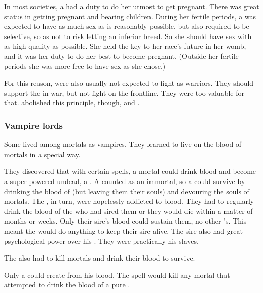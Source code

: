 In most \resphan{} societies, a \resvil{} had a duty to do her utmost to get pregnant. 
There was great status in getting pregnant and bearing children. 
During her fertile periods, a \resvil{} was expected to have as much sex as is reasonably possible, but also required to be selective, so as not to risk letting an inferior \resphan{} breed. 
So she should have sex with as high-quality \resphain{} as possible. 
She held the key to her race's future in her womb, and it was her duty to do her best to become pregnant. 
(Outside her fertile periods she was more free to have sex as she chose.)

For this reason, \resviel{} were also usually not expected to fight as warriors. 
They should support the \resphain{} in war, but not fight on the frontline. 
They were too valuable for that. 
\Mystraacht{} abolished this principle, though, and . 





\subsubsection{Vampire lords}
Some \ashenblood \resphain lived among mortals as vampires. 
They learned to live on the blood of mortals in a special way. 

They discovered that with certain spells, a mortal could drink \resphan blood and become a super-powered undead, a \quo{\reaver}. 
A \reaver {} counted as an immortal, so a \bezed \resphan could survive by drinking the blood of \reavers (but leaving them their souls) and devouring the souls of mortals. 
The \reavers, in turn, were hopelessly addicted to \resphan blood. 
They had to regularly drink the blood of the \resphan who had sired them or they would die within a matter of months or weeks. 
Only their sire's blood could sustain them, no other \resphan's. 
This meant the \reavers would do anything to keep their sire alive. 
The sire also had great psychological power over his \reavers. 
They were practically his slaves. 

The \reavers also had to kill mortals and drink their blood to survive. 

Only a \bezed could create \reavers from his blood. 
The spell would kill any mortal that attempted to drink the blood of a pure \resphan.

